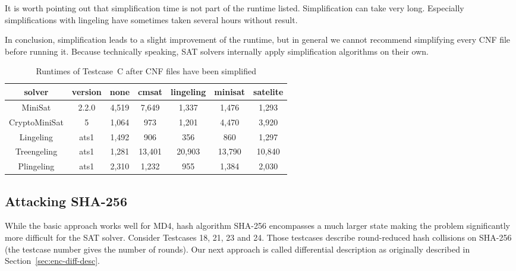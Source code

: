 It is worth pointing out that simplification time is not part of the runtime
listed. Simplification can take very long. Especially simplifications with
lingeling have sometimes taken several hours without result.

In conclusion, simplification leads to a slight improvement of the runtime,
but in general we cannot recommend simplifying every CNF file before running it.
Because technically speaking, SAT solvers internally apply simplification
algorithms on their own.

\begin{table}[!h]
  \begin{center}
    \begin{tabular}{cc|ccccc}
      \textbf{solver} & \textbf{version} & \textbf{none} & \textbf{cmsat} & \textbf{lingeling} & \textbf{minisat} & \textbf{satelite} \\
    \hline
      MiniSat       & 2.2.0              & 4,519    & 7,649    & 1,337    & 1,476    & 1,293 \\
      CryptoMiniSat & 5                  & 1,064    & 973      & 1,201    & 4,470    & 3,920 \\
      Lingeling     & ats1               & 1,492    & 906      & 356      & 860      & 1,297 \\
      Treengeling   & ats1               & 1,281    & 13,401   & 20,903   & 13,790   & 10,840 \\
      Plingeling    & ats1               & 2,310    & 1,232    & 955      & 1,384    & 2,030
    \end{tabular}
    \caption{
      Runtimes of Testcase~C after CNF files have been simplified
    }
    \label{tab:simplification-results}
  \end{center}
\end{table}

\subsection{Attacking SHA-256}
\label{sec:result-diff-desc}
%
While the basic approach works well for MD4, hash algorithm SHA-256 encompasses
a much larger state making the problem significantly more difficult for the SAT solver.
Consider Testcases 18, 21, 23 and 24. Those testcases describe
round-reduced hash collisions on SHA-256 (the testcase number gives
the number of rounds). Our next approach is called differential description
as originally described in Section~\ref{sec:enc-diff-desc}. 

